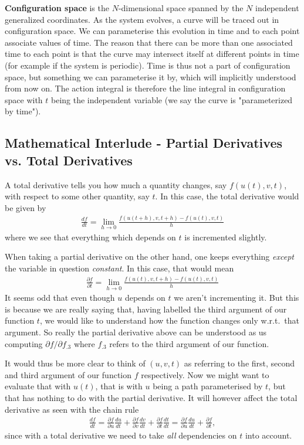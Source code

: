 \documentclass[a4paper]{article}
\begin{document}
    \textbf{Configuration space} is the \(N\)-dimensional space spanned by the \(N\) independent generalized coordinates. As the system evolves, a curve will be traced out in configuration space. We can parameterise this evolution in time and to each point associate values of time. The reason that there can be more than one associated time to each point is that the curve may intersect itself at different points in time (for example if the system is periodic). Time is thus not a part of configuration space, but something we can parameterise it by, which will implicitly understood from now on. The action integral is therefore the line integral in configuration space with \(t\) being the independent variable (we say the curve is "parameterized by time"). 
    
    \subsection{Mathematical Interlude - Partial Derivatives vs. Total Derivatives}
    A total derivative tells you how much a quantity changes, say \(f(u(t), v, t)\), with respect to some other quantity, say \(t\). In this case, the total derivative would be given by \begin{align*}
        \frac{df}{dt} = \lim_{h \to 0} \frac{f(u(t + h), v, t + h) - f(u(t), v, t)}{h}
    \end{align*}
    where we see that everything which depends on \(t\) is incremented slightly.

    When taking a partial derivative on the other hand, one keeps everything \textit{except} the variable in question \textit{constant}. In this case, that would mean \begin{align*}
        \frac{\partial f}{\partial t} = \lim_{h \to 0} \frac{f(u(t), v, t + h) - f(u(t), v, t)}{h} 
    \end{align*}
    It seems odd that even though \(u\) depends on \(t\) we aren't incrementing it. But this is because we are really saying that, having labelled the third argument of our function \(t\), we would like to understand how the function changes only w.r.t.\ that argument. So really the partial derivative above can be understood as us computing \(\partial f / \partial f_{.3}\) where \(f_{.3}\) refers to the third argument of our function.

    It would thus be more clear to think of \((u, v, t)\) as referring to the first, second and third argument of our function \(f\) respectively. Now we might want to evaluate that with \(u(t)\), that is with \(u\) being a path parameterised by \(t\), but that has nothing to do with the partial derivative. It will however affect the total derivative as seen with the chain rule \begin{align*}
        \frac{df}{dt} = \frac{\partial f}{\partial u} \frac{du}{dt} + \frac{\partial f}{\partial v} \frac{dv}{dt} + \frac{\partial f}{\partial t} \frac{dt}{dt} = \frac{\partial f}{\partial u} \frac{du}{dt} + \frac{\partial f}{\partial t},
    \end{align*}
    since with a total derivative we need to take \textit{all} dependencies on \(t\) into account.
\end{document}

